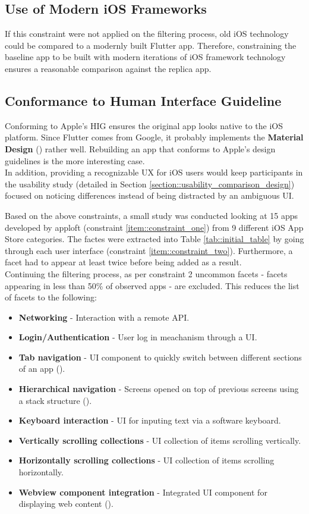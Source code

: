 \subsection*{Use of Modern iOS Frameworks}
If this constraint were not applied on the filtering process, old iOS technology could be compared to a modernly built Flutter app. 
Therefore, constraining the baseline app to be built with modern iterations of iOS framework technology ensures a reasonable comparison 
against the replica app.

\subsection*{Conformance to Human Interface Guideline}
Conforming to Apple's HIG ensures the original app looks native to the iOS platform.
Since Flutter comes from Google, it probably implements the \textbf{Material Design} (\cite{Google2021}) rather well. Rebuilding an app that conforms to Apple's design guidelines is the more interesting case.\\
In addition, providing a recognizable UX for iOS users would keep participants in the usability study (detailed in Section \ref{section::usability_comparison_design}) focused on noticing differences instead of 
being distracted by an ambiguous UI.
\hfill \break

Based on the above constraints, a small study was conducted looking at 15 apps developed by apploft (constraint \ref{item::constraint_one}) from 9 different iOS App Store categories. 
The factes were extracted into Table \ref{tab::initial_table} by going through each user interface (constraint \ref{item::constraint_two}).
Furthermore, a facet had to appear at least twice before being added as a result.\\
Continuing the filtering process, as per constraint 2 uncommon facets - facets appearing
in less than 50\% of observed apps - are excluded. This reduces the list of facets to the following:

\begin{itemize}
    \item \textbf{Networking} - Interaction with a remote API.
    \item \textbf{Login/Authentication} - User log in meachanism through a UI.
    \item \textbf{Tab navigation} - UI component to quickly switch between different sections of an app (\cite{AppleHIGTabBar2021}).
    \item \textbf{Hierarchical navigation} - Screens opened on top of previous screens using a stack structure (\cite{AppleHIGNavigation2021}).
    \item \textbf{Keyboard interaction} - UI for inputing text via a software keyboard.
    \item \textbf{Vertically scrolling collections} - UI collection of items scrolling vertically.
    \item \textbf{Horizontally scrolling collections} - UI collection of items scrolling horizontally.
    \item \textbf{Webview component integration} - Integrated UI component for displaying web content (\cite{AppleHIGWebViews2021}).
\end{itemize}

